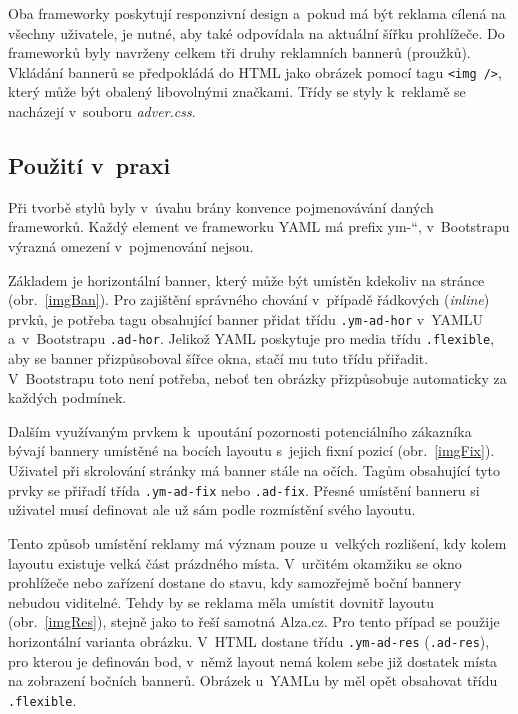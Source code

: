 \documentclass[thesis=B,czech]{FITthesis}[2012/06/26]
\begin{document}
Oba frameworky poskytují responzivní design a~pokud má být reklama cílená na všechny uživatele, je nutné, aby také odpovídala na aktuální šířku prohlížeče. Do frameworků byly navrženy celkem tři druhy reklamních bannerů (proužků). Vkládání bannerů se předpokládá do \gls{HTML} jako obrázek pomocí tagu \verb#<img />#, který může být obalený libovolnými značkami. Třídy se styly k~reklamě se nacházejí v~souboru \textit{adver.css}.

\subsection{Použití v~praxi}
Při tvorbě stylů byly v~úvahu brány konvence pojmenovávání daných frameworků. Každý element ve frameworku \gls{YAML} má prefix \quotedblbase ym-\textquotedblleft , v~Bootstrapu výrazná omezení v~pojmenování nejsou. 

Základem je horizontální banner, který může být umístěn kdekoliv na stránce (obr.~\ref{imgBan}). Pro zajištění správného chování v~případě řádkových (\textit{inline}) prvků, je potřeba tagu obsahující banner přidat třídu \verb#.ym-ad-hor# v~\gls{YAML}U a~v~Bootstrapu \verb#.ad-hor#. Jelikož \gls{YAML} poskytuje pro media třídu \verb#.flexible#, aby se banner přizpůsoboval šířce okna, stačí mu tuto třídu přiřadit. V~Bootstrapu toto není potřeba, neboť ten obrázky přizpůsobuje automaticky za každých podmínek.



Dalším využívaným prvkem k~upoutání pozornosti potenciálního zákazníka bývají bannery umístěné na bocích layoutu s~jejich fixní pozicí (obr.~\ref{imgFix}). Uživatel při skrolování stránky má banner stále na očích. Tagům obsahující tyto prvky se přiřadí třída \verb#.ym-ad-fix# nebo \verb#.ad-fix#. Přesné umístění banneru si uživatel musí definovat ale už sám podle rozmístění svého layoutu. 


Tento způsob umístění reklamy má význam pouze u~velkých rozlišení, kdy kolem layoutu existuje velká část prázdného místa. V~určitém okamžiku se okno prohlížeče nebo zařízení dostane do stavu, kdy samozřejmě boční bannery nebudou viditelné. Tehdy by se reklama měla umístit dovnitř layoutu (obr.~\ref{imgRes}), stejně jako to řeší samotná Alza.cz. Pro tento případ se použije horizontální varianta obrázku. V~\gls{HTML} dostane třídu \verb#.ym-ad-res# (\verb#.ad-res#), pro kterou je definován bod, v~němž layout nemá kolem sebe již dostatek místa na zobrazení bočních bannerů. Obrázek u~\gls{YAML}u by měl opět obsahovat třídu \verb#.flexible#.
\end{document}
